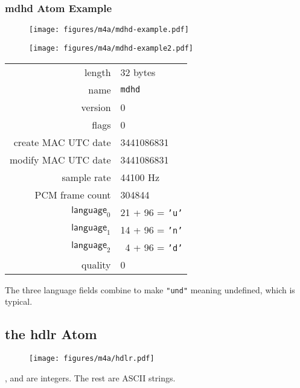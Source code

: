 \subsubsection{mdhd Atom Example}
\begin{figure}[h]
  \texttt{[image: figures/m4a/mdhd-example.pdf]}
\end{figure}
\begin{figure}[h]
  \texttt{[image: figures/m4a/mdhd-example2.pdf]}
\end{figure}
\par
\noindent
\begin{tabular}{rl}
  \textsf{length} & 32 bytes \\
  \textsf{name} & \texttt{mdhd} \\
  \textsf{version} & 0 \\
  \textsf{flags} & 0 \\
  \textsf{create MAC UTC date} & 3441086831 \\
  \textsf{modify MAC UTC date} & 3441086831 \\
  \textsf{sample rate} & 44100 Hz \\
  \textsf{PCM frame count} & 304844 \\
  $\textsf{language}_0$ & \multicolumn{1}{r}{21 + 96 = \texttt{'u'}} \\
  $\textsf{language}_1$ & \multicolumn{1}{r}{14 + 96 = \texttt{'n'}} \\
  $\textsf{language}_2$ & \multicolumn{1}{r}{4 + 96 = \texttt{'d'}} \\
  \textsf{quality} & 0 \\
\end{tabular}
\par
\noindent
The three language fields combine to make \texttt{"und"} meaning
undefined, which is typical.

\clearpage

\subsection{the hdlr Atom}
\label{atom:hdlr}
\begin{figure}[h]
\texttt{[image: figures/m4a/hdlr.pdf]}
\end{figure}
\par
\noindent
{},  and
are integers.  The rest are ASCII strings.

